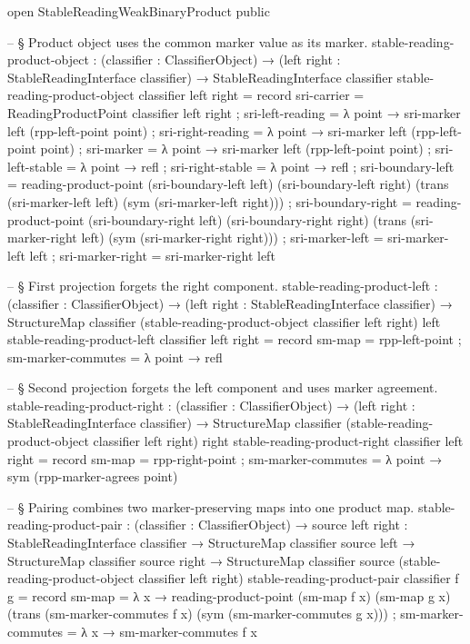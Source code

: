 \documentclass[11pt]{article}
\begin{document}
\begin{code}
open StableReadingWeakBinaryProduct public

-- § Product object uses the common marker value as its marker.
stable-reading-product-object :
  (classifier : ClassifierObject) →
  (left right : StableReadingInterface classifier) →
  StableReadingInterface classifier
stable-reading-product-object classifier left right = record
  { sri-carrier = ReadingProductPoint classifier left right
  ; sri-left-reading = λ point → sri-marker left (rpp-left-point point)
  ; sri-right-reading = λ point → sri-marker left (rpp-left-point point)
  ; sri-marker = λ point → sri-marker left (rpp-left-point point)
  ; sri-left-stable = λ point → refl
  ; sri-right-stable = λ point → refl
  ; sri-boundary-left = reading-product-point
      (sri-boundary-left left)
      (sri-boundary-left right)
      (trans (sri-marker-left left) (sym (sri-marker-left right)))
  ; sri-boundary-right = reading-product-point
      (sri-boundary-right left)
      (sri-boundary-right right)
      (trans (sri-marker-right left) (sym (sri-marker-right right)))
  ; sri-marker-left = sri-marker-left left
  ; sri-marker-right = sri-marker-right left
  }

-- § First projection forgets the right component.
stable-reading-product-left :
  (classifier : ClassifierObject) →
  (left right : StableReadingInterface classifier) →
  StructureMap classifier (stable-reading-product-object classifier left right) left
stable-reading-product-left classifier left right = record
  { sm-map             = rpp-left-point
  ; sm-marker-commutes = λ point → refl
  }

-- § Second projection forgets the left component and uses marker agreement.
stable-reading-product-right :
  (classifier : ClassifierObject) →
  (left right : StableReadingInterface classifier) →
  StructureMap classifier (stable-reading-product-object classifier left right) right
stable-reading-product-right classifier left right = record
  { sm-map             = rpp-right-point
  ; sm-marker-commutes = λ point → sym (rpp-marker-agrees point)
  }

-- § Pairing combines two marker-preserving maps into one product map.
stable-reading-product-pair :
  (classifier : ClassifierObject) →
  {source left right : StableReadingInterface classifier} →
  StructureMap classifier source left →
  StructureMap classifier source right →
  StructureMap classifier source (stable-reading-product-object classifier left right)
stable-reading-product-pair classifier f g = record
  { sm-map = λ x → reading-product-point
      (sm-map f x)
      (sm-map g x)
      (trans (sm-marker-commutes f x) (sym (sm-marker-commutes g x)))
  ; sm-marker-commutes = λ x → sm-marker-commutes f x
  }


\end{code}
\end{document}
